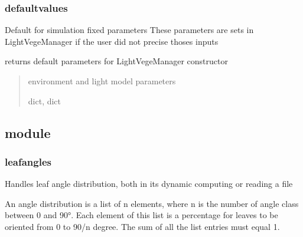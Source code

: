 \documentclass[letterpaper,10pt,english]{sphinxmanual}
\begin{document}
\subsubsection{defaultvalues}
\label{\detokenize{reference:defaultvalues}}
\sphinxAtStartPar
Default for simulation fixed parameters
These parameters are sets in LightVegeManager if the user did not precise thoses inputs

\begin{fulllineitems}
\label{\detokenize{reference:defaultvalues.default_LightVegeManager_inputs}}
\pysigstartsignatures
{}
\pysigstopsignatures
\sphinxAtStartPar
returns default parameters for LightVegeManager constructor 
\begin{quote}\begin{description}
\sphinxAtStartPar
environment and light model parameters

\sphinxAtStartPar
dict, dict

\end{description}\end{quote}

\end{fulllineitems}



\subsection{ module}
\label{\detokenize{reference:module-leafangles}}\label{\detokenize{reference:leafangles-module}}

\subsubsection{leafangles}
\label{\detokenize{reference:leafangles}}
\sphinxAtStartPar
Handles leaf angle distribution, both in its dynamic computing or reading a file

\sphinxAtStartPar
An angle distribution is a list of n elements, where n is the number of angle class between 0 and
90°. Each element of this list is a percentage for leaves to be oriented from 0 to 90/n degree.
The sum of all the list entries must equal 1.
\end{document}
